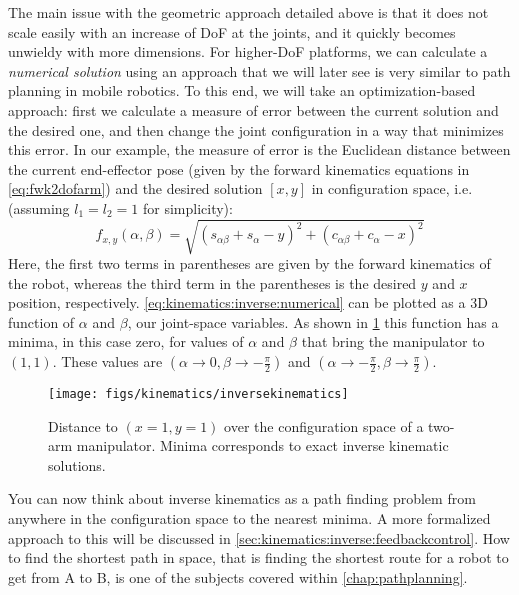 The main issue with the geometric approach detailed above is that it does not scale easily with an increase of DoF at the joints, and it quickly becomes unwieldy with more dimensions.
For higher-DoF platforms, we can calculate a \textsl{numerical solution} using an approach that we will later see is very similar to path planning in mobile robotics.
To this end, we will take an optimization-based approach: first we calculate a measure of error between the current solution and the desired one, and then change the joint configuration in a way that minimizes this error.
In our example, the measure of error is the Euclidean distance between the current end-effector pose (given by the forward kinematics equations in \cref{eq:fwk2dofarm}) and the desired solution $[x,y]$ in configuration space, i.e. (assuming $l_1=l_2=1$ for simplicity):
\begin{equation}\label{eq:kinematics:inverse:numerical}
f_{x,y}(\alpha,\beta)=\sqrt{\left(s_{\alpha\beta} + s_\alpha - y\right)^2 + \left(c_{\alpha\beta}+c_\alpha - x\right)^2}
\end{equation}
Here, the first two terms in parentheses are given by the forward kinematics of the robot, whereas the third term in the parentheses is the desired $y$ and $x$ position, respectively.
\cref{eq:kinematics:inverse:numerical} can be plotted as a 3D function of $\alpha$ and $\beta$, our joint-space variables.
As shown in \cref{fig:inversekinematics} this function has a minima, in this case zero, for values of $\alpha$ and $\beta$ that bring the manipulator to $(1,1)$. These values are $(\alpha \rightarrow 0, \beta \rightarrow -\frac{\pi}{2})$ and $(\alpha \rightarrow -\frac{\pi}{2}, \beta \rightarrow \frac{\pi}{2})$.

\begin{figure}
    \centering
        \texttt{[image: figs/kinematics/inversekinematics]}
    \caption{Distance to $(x=1,y=1)$ over the configuration space of a two-arm manipulator. Minima corresponds to exact inverse kinematic solutions.}
    \label{fig:inversekinematics}
\end{figure}

You can now think about inverse kinematics as a path finding problem from anywhere in the configuration space to the nearest minima. A more formalized approach to this will be discussed in \cref{sec:kinematics:inverse:feedbackcontrol}. How to find the shortest path in space, that is finding the shortest route for a robot to get from A to B, is one of the subjects covered within \cref{chap:pathplanning}.


